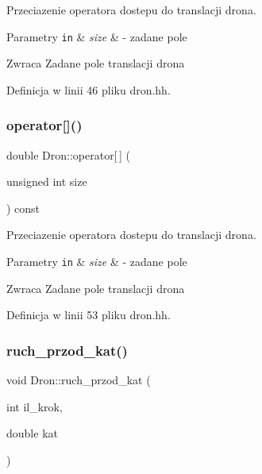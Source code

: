 Przeciazenie operatora dostepu do translacji drona. 


\begin{DoxyParams}[1]{Parametry}
\mbox{\tt in}  & {\em size} & -\/ zadane pole \\
\hline
\end{DoxyParams}
\begin{DoxyReturn}{Zwraca}
Zadane pole translacji drona 
\end{DoxyReturn}


Definicja w linii 46 pliku dron.\+hh.

\mbox{\label{class_dron_a95002d53f1714a63b5ff6f272e5ef462}} 
\subsubsection{\texorpdfstring{operator[]()}{operator[]()}\hspace{0.1cm}{\footnotesize\ttfamily [2/2]}}
{\footnotesize\ttfamily double Dron\+::operator\mbox{[}$\,$\mbox{]} (\begin{DoxyParamCaption}\item[{unsigned int}]{size }\end{DoxyParamCaption}) const\hspace{0.3cm}{\ttfamily [inline]}}



Przeciazenie operatora dostepu do translacji drona. 


\begin{DoxyParams}[1]{Parametry}
\mbox{\tt in}  & {\em size} & -\/ zadane pole \\
\hline
\end{DoxyParams}
\begin{DoxyReturn}{Zwraca}
Zadane pole translacji drona 
\end{DoxyReturn}


Definicja w linii 53 pliku dron.\+hh.

\mbox{\label{class_dron_aa46e419441838e4bdd770396a45cc437}} 
\subsubsection{\texorpdfstring{ruch\+\_\+przod\+\_\+kat()}{ruch\_przod\_kat()}}
{\footnotesize\ttfamily void Dron\+::ruch\+\_\+przod\+\_\+kat (\begin{DoxyParamCaption}\item[{int}]{il\+\_\+krok,  }\item[{double}]{kat }\end{DoxyParamCaption})}



